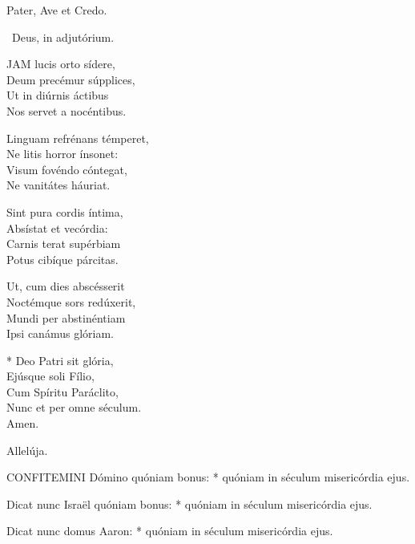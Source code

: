 
\sectionornament


Pater, Ave et Credo.

\V\ Deus, in adjutórium.


\lettrine[lines=2]{J}{AM} lucis orto sídere,\\
Deum precémur súpplices,\\
Ut in diúrnis áctibus\\
Nos servet a nocéntibus.

Linguam refrénans témperet,\\
Ne litis horror ínsonet:\\
Visum fovéndo cóntegat,\\
Ne vanitátes háuriat.

Sint pura cordis íntima,\\
Absístat et vecórdia:\\
Carnis terat supérbiam\\
Potus cibíque párcitas.

Ut, cum dies abscésserit\\
Noctémque sors redúxerit,\\
Mundi per abstinéntiam\\
Ipsi canámus glóriam.

* Deo Patri sit glória,\\
Ejúsque soli Fílio,\\
Cum Spíritu Paráclito,\\
Nunc et per omne séculum.\\
Amen.


  Allelúja.



\lettrine[lines=2]{C}{ONFITEMINI} Dómino quóniam bonus: * quóniam in séculum misericórdia ejus.

Dicat nunc Israël quóniam bonus: * quóniam in séculum misericórdia ejus.

Dicat nunc domus Aaron: * quóniam in séculum misericórdia ejus.

